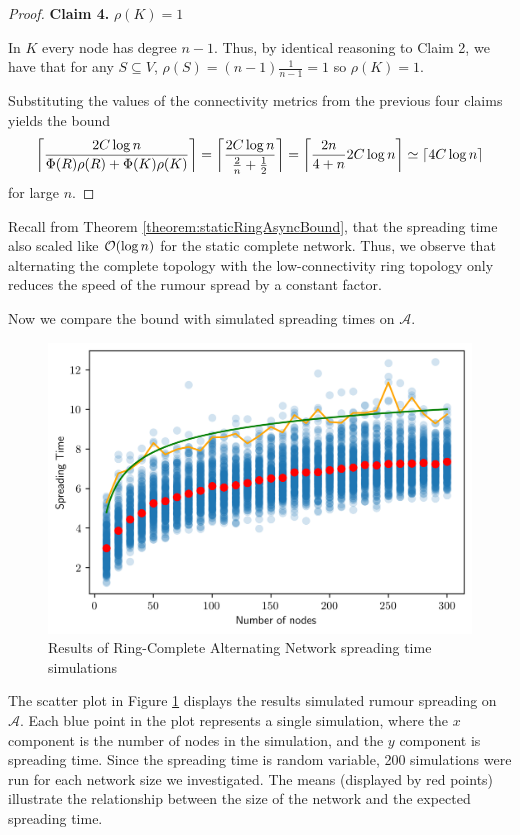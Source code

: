 \begin{proof}
\textbf{Claim 4.}  $\rho(K)=1$

In $K$ every node has degree $n - 1$. Thus, by identical reasoning to Claim 2, we have that for any $S \subseteq V$, $\rho(S) = (n-1)\frac{1}{n-1} = 1$ so $\rho(K) = 1$.

Substituting the values of the connectivity metrics from the previous four claims yields the bound
$$
	\ceil*{\frac{2C \log n}{\Phi(R)\rho(R) + \Phi(K)\rho(K)}} = \ceil*{\frac{2C \log n}{\frac{2}{n} + \frac{1}{2}}}
	= \ceil*{\frac{2n}{4+n} 2C\log n}
	\simeq \ceil*{4C \log n}
$$
for large $n$.

\end{proof}

Recall from Theorem \ref{theorem:staticRingAsyncBound}, that the spreading time also scaled like $\bigO(\log n)$ for the static complete network. Thus, we observe that alternating the complete topology with the low-connectivity ring topology only reduces the speed of the rumour spread by a constant factor.


Now we compare the bound with simulated spreading times on $\mathcal{A}$.

\begin{figure}[h]
	\centering
	\includegraphics[width=1\textwidth]{./figures/alternating_ring_simulation_results.png}
	\caption{Results of Ring-Complete Alternating Network spreading time simulations}
	\label{fig:alternatingSimResults}
\end{figure}

The scatter plot in Figure \ref{fig:alternatingSimResults} displays the results simulated rumour spreading on $\mathcal{A}$. Each blue point in the plot represents a single simulation, where the $x$ component is the number of nodes in the simulation, and the $y$ component is spreading time. Since the spreading time is random variable, 200 simulations were run for each network size we investigated. The means (displayed by red points) illustrate the relationship between the size of the network and the expected spreading time. 

